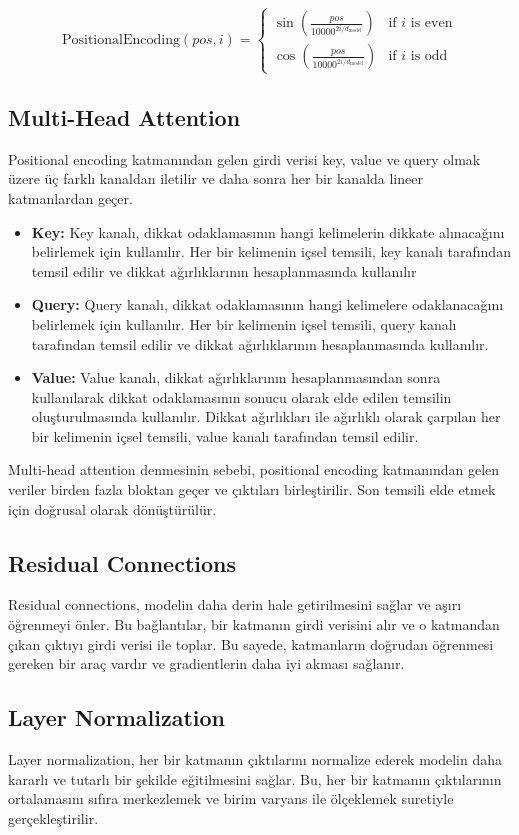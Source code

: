 \[\text{PositionalEncoding}(pos, i) = \begin{cases}
    \sin\left(\frac{pos}{10000^{2i/d_{\text{model}}}}\right) & \text{if } i \text{ is even} \\
    \cos\left(\frac{pos}{10000^{2i/d_{\text{model}}}}\right) & \text{if } i \text{ is odd}
\end{cases}\]

\subsection{Multi-Head Attention}
Positional encoding katmanından gelen girdi verisi key, value ve query olmak üzere üç farklı kanaldan iletilir ve daha sonra her bir kanalda lineer katmanlardan geçer. 
\begin{itemize}
    \item \textbf{Key:} Key kanalı, dikkat odaklamasının hangi kelimelerin dikkate alınacağını belirlemek için kullanılır. Her bir kelimenin içsel temsili, key kanalı tarafından temsil edilir ve dikkat ağırlıklarının hesaplanmasında kullanılır
    \item \textbf{Query:} Query kanalı, dikkat odaklamasının hangi kelimelere odaklanacağını belirlemek için kullanılır. Her bir kelimenin içsel temsili, query kanalı tarafından temsil edilir ve dikkat ağırlıklarının hesaplanmasında kullanılır.
    \item \textbf{Value:} Value kanalı, dikkat ağırlıklarının hesaplanmasından sonra kullanılarak dikkat odaklamasının sonucu olarak elde edilen temsilin oluşturulmasında kullanılır. Dikkat ağırlıkları ile ağırlıklı olarak çarpılan her bir kelimenin içsel temsili, value kanalı tarafından temsil edilir.
\end{itemize}
Multi-head attention denmesinin sebebi, positional encoding katmanından gelen veriler birden fazla bloktan geçer ve çıktıları birleştirilir. Son temsili elde etmek için doğrusal olarak dönüştürülür.

\subsection{Residual Connections}
Residual connections, modelin daha derin hale getirilmesini sağlar ve aşırı öğrenmeyi önler. Bu bağlantılar, bir katmanın girdi verisini alır ve o katmandan çıkan çıktıyı girdi verisi ile toplar. Bu sayede, katmanların doğrudan öğrenmesi gereken bir araç vardır ve gradientlerin daha iyi akması sağlanır.

\subsection{Layer Normalization}
Layer normalization, her bir katmanın çıktılarını normalize ederek modelin daha kararlı ve tutarlı bir şekilde eğitilmesini sağlar. Bu, her bir katmanın çıktılarının ortalamasını sıfıra merkezlemek ve birim varyans ile ölçeklemek suretiyle gerçekleştirilir.

